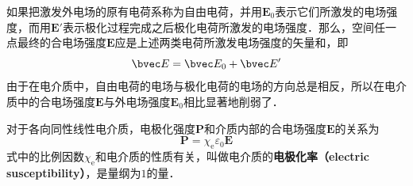 

如果把激发外电场的原有电荷系称为自由电荷，并用$\mathbf E_0$表示它们所激发的电场强度，而用$\mathbf E'$表示极化过程完成之后极化电荷所激发的电场强度．那么，空间任一点最终的合电场强度$\mathbf E $应是上述两类电荷所激发电场强度的矢量和，即
\begin{equation}
\bvec E = \bvec E_{0} + \bvec E'
\end{equation}
由于在电介质中，自由电荷的电场与极化电荷的电场的方向总是相反，所以在电介质中的合电场强度$\mathbf E $与外电场强度$\mathbf E_0$相比显著地削弱了．

对于各向同性线性电介质，电极化强度$\mathbf P $和介质内部的合电场强度$\mathbf E $的关系为
\begin{equation} 
\mathbf P=\chi_{\mathrm e} \varepsilon_{0} \mathbf E
\end{equation}
式中的比例因数$\chi_{\mathrm{e}}$和电介质的性质有关，叫做电介质的\textbf{电极化率（electric susceptibility）}，是量纲为$1 $的量．

